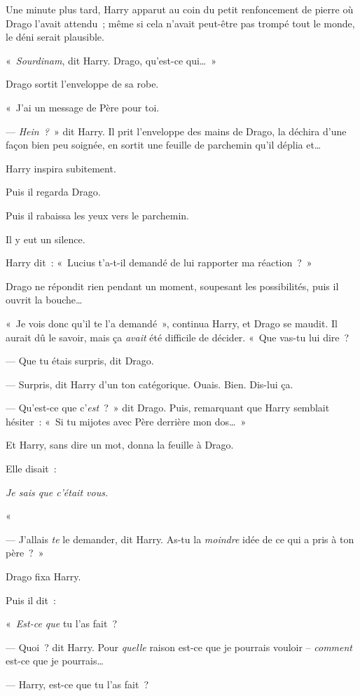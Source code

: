 Une minute plus tard, Harry apparut au coin du petit renfoncement de pierre où Drago l'avait attendu~; même si cela n'avait peut-être pas trompé tout le monde, le déni serait plausible.

«~\emph{Sourdinam}, dit Harry. Drago, qu'est-ce qui…~»

Drago sortit l'enveloppe de sa robe.

«~J'ai un message de Père pour toi.

--- \emph{Hein~?}~» dit Harry. Il prit l'enveloppe des mains de Drago, la déchira d'une façon bien peu soignée, en sortit une feuille de parchemin qu'il déplia et…

Harry inspira subitement.

Puis il regarda Drago.

Puis il rabaissa les yeux vers le parchemin.

Il y eut un silence.

Harry dit~: «~Lucius t'a-t-il demandé de lui rapporter ma réaction~?~»

Drago ne répondit rien pendant un moment, soupesant les possibilités, puis il ouvrit la bouche…

«~Je vois donc qu'il te l'a demandé~», continua Harry, et Drago se maudit. Il aurait dû le savoir, mais ça \emph{avait} été difficile de décider. «~Que vas-tu lui dire~?

--- Que tu étais surpris, dit Drago.

--- Surpris, dit Harry d'un ton catégorique. Ouais. Bien. Dis-lui ça.

--- Qu'est-ce que c'\emph{est}~?~» dit Drago. Puis, remarquant que Harry semblait hésiter~: «~Si tu mijotes avec Père derrière mon dos…~»

Et Harry, sans dire un mot, donna la feuille à Drago.

Elle disait~:

\emph{Je sais que c'était vous.}

«~\emph{}

--- J'allais \emph{te} le demander, dit Harry. As-tu la \emph{moindre} idée de ce qui a pris à ton père~?~»

Drago fixa Harry.

Puis il dit~:

«~\emph{Est-ce que} tu l'as fait~?

--- Quoi~? dit Harry. Pour \emph{quelle} raison est-ce que je pourrais vouloir -- \emph{comment} est-ce que je pourrais…

--- Harry, est-ce que tu l'as fait~?

